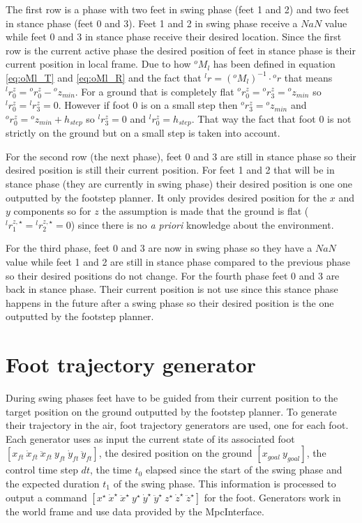 \documentclass[a4paper,11pt]{article}
\newcommand{\fM}[2]{{}^{#1}\!M_{#2}}
\begin{document}
The first row is a phase with two feet in swing phase (feet 1 and 2) and two feet in stance phase (feet 0 and 3). Feet 1 and 2 in swing phase receive a $\mathit{NaN}$ value while feet 0 and 3 in stance phase receive their desired location. Since the first row is the current active phase the desired position of feet in stance phase is their current position in local frame. Due to how $\fM{o}{l}$ has been defined in equation \ref{eq:oMl_T} and \ref{eq:oMl_R} and the fact that ${}^l\!r = (\fM{o}{l})^{-1} \cdot {}^o\!r$ that means ${}^l\!r_0^z = {}^o\!r_0^z - {}^o\!z_{min}$. For a ground that is completely flat ${}^o\!r_0^z = {}^o\!r_3^z = {}^o\!z_{min}$ so ${}^l\!r_0^z  = {}^l\!r_3^z  = 0$. However if foot 0 is on a small step then ${}^o\!r_3^z = {}^o\!z_{min}$ and ${}^o\!r_0^z = {}^o\!z_{min} + h_{step}$ so ${}^l\!r_3^z  = 0$ and ${}^l\!r_0^z = h_{step}$. That way the fact that foot 0 is not strictly on the ground but on a small step is taken into account.

For the second row (the next phase), feet 0 and 3 are still in stance phase so their desired position is still their current position. For feet 1 and 2 that will be in stance phase (they are currently in swing phase) their desired position is one one outputted by the footstep planner. It only provides desired position for the $x$ and $y$ components so for $z$ the assumption is made that the ground is flat (${}^l\!r_1^{z,\star} = {}^l\!r_2^{z,\star} = 0$) since there is no \textit{a priori} knowledge about the environment.

For the third phase, feet 0 and 3 are now in swing phase so they have a $\mathit{NaN}$ value while feet 1 and 2 are still in stance phase compared to the previous phase so their desired positions do not change. For the fourth phase feet 0 and 3 are back in stance phase. Their current position is not use since this stance phase happens in the future after a swing phase so their desired position is the one outputted by the footstep planner.

\section{Foot trajectory generator}

During swing phases feet have to be guided from their current position to the target position on the ground outputted by the footstep planner. To generate their trajectory in the air, foot trajectory generators are used, one for each foot. Each generator uses as input the current state of its associated foot $[x_{ft} ~ \dot x_{ft} ~ \ddot x_{ft} ~ y_{ft} ~ \dot y_{ft} ~ \ddot y_{ft}]$, the desired position on the ground $[x_{goal} ~ y_{goal}]$, the control time step $dt$, the time $t_0$ elapsed since the start of the swing phase and the expected duration $t_1$ of the swing phase. This information is processed to output a command $[x^\star ~ \dot x^\star ~ \ddot x^\star ~ y^\star ~ \dot y^\star ~ \ddot y^\star ~ z^\star ~ \dot z^\star ~ \ddot z^\star]$ for the foot. Generators work in the world frame and use data provided by the MpcInterface.
\end{document}
